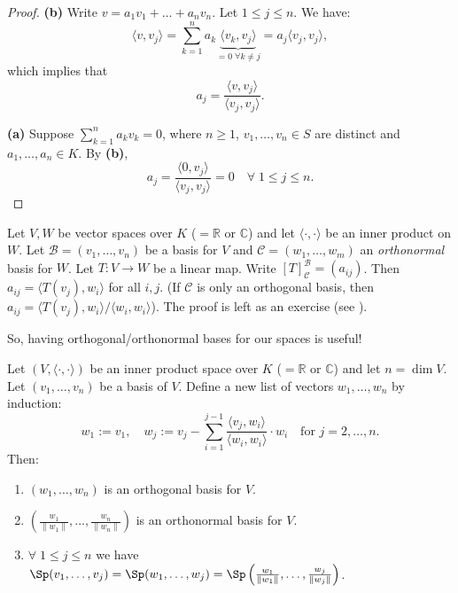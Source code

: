 \begin{proof}
    \textbf{(b)} Write $v = a_1 v_1 + \dots + a_n v_n$. Let $1 \leq j \leq n$. We have:
    \[
        \langle v, v_j \rangle = \sum_{k=1}^n a_k \underbrace{\langle v_k, v_j \rangle}_{= 0 \; \forall k \neq j} = a_j \langle v_j, v_j \rangle,
    \]
    which implies that
    \[
        a_j = \frac{\langle v, v_j \rangle}{\langle v_j, v_j \rangle}.
    \]
    
    \textbf{(a)} Suppose $\sum_{k=1}^n a_k v_k = 0$, where $n \geq 1$, $v_1, \dots, v_n \in S$ are distinct and $a_1, \dots, a_n \in K$. By \textbf{(b)},
    \[
        a_j = \frac{\langle 0, v_j \rangle}{\langle v_j, v_j \rangle} = 0 \quad \forall \; 1 \leq j \leq n.
    \]
\end{proof}

\begin{proposition}
\label{prop:matrix_representation_orthonormal}
    Let $V, W$ be vector spaces over $K$ ($= \mathbb{R}$ or $\mathbb{C}$) and let $\langle \cdot, \cdot \rangle$ be an inner product on $W$. Let $\mathcal{B} = (v_1, \dots, v_n)$ be a basis for $V$ and $\mathcal{C} = (w_1, \dots, w_m)$ an \emph{orthonormal} basis for $W$. Let $T: V \to W$ be a linear map. Write $[T]_{\mathcal{C}}^{\mathcal{B}} = (a_{ij})$. Then $a_{ij} = \langle T(v_j), w_i \rangle$ for all $i,j$. 
    (If $\mathcal{C}$ is only an orthogonal basis, then $a_{ij} = \langle T(v_j), w_i \rangle / \langle w_i, w_i \rangle$).
    The proof is left as an exercise (see ).
\end{proposition}

So, having orthogonal/orthonormal bases for our spaces is useful!

\begin{theorem}
\label{thm:gram_schmidt}
    Let $(V, \langle \cdot, \cdot \rangle)$ be an inner product space over $K$ ($= \mathbb{R}$ or $\mathbb{C}$) and let $n = \dim V$. Let $(v_1, \dots, v_n)$ be a basis of $V$. Define a new list of vectors $w_1, \dots, w_n$ by induction:
    \[
        w_1 := v_1, \quad w_j := v_j - \sum_{i=1}^{j-1} \frac{\langle v_j, w_i \rangle}{\langle w_i, w_i \rangle} \cdot w_i \quad \text{for } j = 2, \dots, n.
    \]
    Then:
    \begin{enumerate}[label=\textbf{(\alph*)}]
        \item $(w_1, \dots, w_n)$ is an orthogonal basis for $V$.
        \item $\left( \frac{w_1}{\|w_1\|}, \dots, \frac{w_n}{\|w_n\|} \right)$ is an orthonormal basis for $V$.
        \item $\forall \; 1 \leq j \leq n$ we have $\Sp(v_1, \dots, v_j) = \Sp(w_1, \dots, w_j) = \Sp\left(\frac{w_1}{\|w_1\|}, \dots, \frac{w_j}{\|w_j\|}\right)$.
    \end{enumerate}
\end{theorem}

